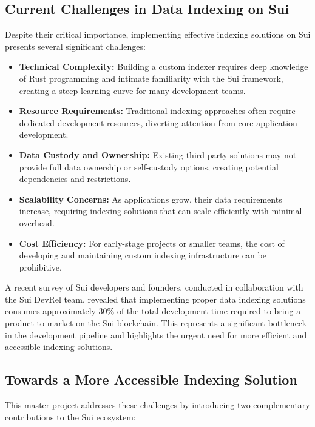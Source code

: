 \subsection{Current Challenges in Data Indexing on Sui}

Despite their critical importance, implementing effective indexing solutions on Sui presents several significant challenges:

\begin{itemize}
    \item \textbf{Technical Complexity:} Building a custom indexer requires deep knowledge of Rust programming and intimate familiarity with the Sui framework, creating a steep learning curve for many development teams.
    \item \textbf{Resource Requirements:} Traditional indexing approaches often require dedicated development resources, diverting attention from core application development.
    \item \textbf{Data Custody and Ownership:} Existing third-party solutions may not provide full data ownership or self-custody options, creating potential dependencies and restrictions.
    \item \textbf{Scalability Concerns:} As applications grow, their data requirements increase, requiring indexing solutions that can scale efficiently with minimal overhead.
    \item \textbf{Cost Efficiency:} For early-stage projects or smaller teams, the cost of developing and maintaining custom indexing infrastructure can be prohibitive.
\end{itemize}

A recent survey of Sui developers and founders, conducted in collaboration with the Sui DevRel team, revealed that implementing proper data indexing solutions consumes approximately 30\% of the total development time required to bring a product to market on the Sui blockchain. This represents a significant bottleneck in the development pipeline and highlights the urgent need for more efficient and accessible indexing solutions.

\subsection{Towards a More Accessible Indexing Solution}

This master project addresses these challenges by introducing two complementary contributions to the Sui ecosystem:

